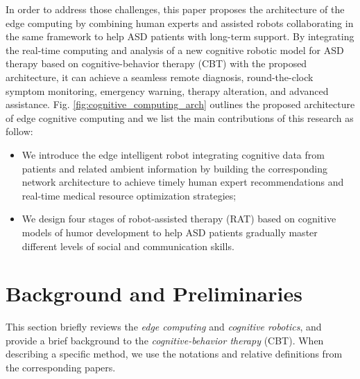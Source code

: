 \documentclass[letterpaper]{article} %
\begin{document}


In order to address those challenges, this paper proposes the architecture of the edge computing by combining human experts and assisted robots collaborating in the same framework to help ASD patients with long-term support. By integrating the real-time computing and analysis of a new cognitive robotic model for ASD therapy based on cognitive-behavior therapy (CBT) \cite{beck2020cognitive} with the proposed architecture, it can achieve a seamless remote diagnosis, round-the-clock symptom monitoring, emergency warning, therapy alteration, and advanced assistance. Fig. \ref{fig:cognitive_computing_arch} outlines the proposed architecture of edge cognitive computing and we list the main contributions of this research as follow:

\begin{itemize}
    \item We introduce the edge intelligent robot integrating cognitive data from patients and related ambient information by building the corresponding network architecture to achieve timely human expert recommendations and real-time medical resource optimization strategies;
    \item We design four stages of robot-assisted therapy (RAT) based on cognitive models of humor development to help ASD patients gradually master different levels of social and communication skills.
\end{itemize}

\section{Background and Preliminaries}

This section briefly reviews the \textit{edge computing} and \textit{cognitive robotics}, and provide a brief background to the \textit{cognitive-behavior therapy} (CBT). When describing a specific method, we use the notations and relative definitions from the corresponding papers.
\end{document}
